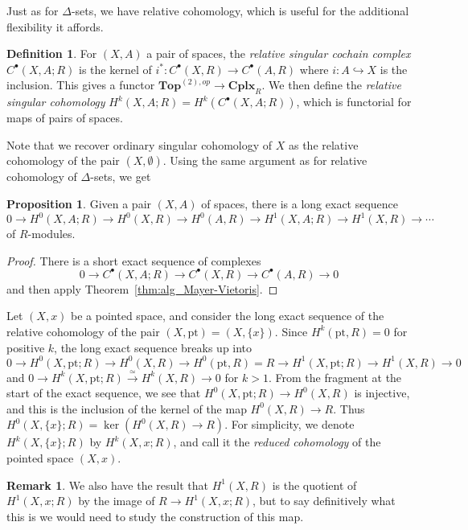 \documentclass{tufte-handout}
\def\into {\hookrightarrow}
\def\pt {\mathrm{pt}}
\def\Top {\mathbf{Top}}
\def\Cplx{\mathbf{Cplx}}
\theoremstyle{definition}
\newtheorem{prop}{Proposition}
\newtheorem{definition}{Definition}
\newtheorem*{rem}{Remark}
\begin{document}
Just as for $\Delta$-sets, we have relative cohomology, which is useful for the additional flexibility
it affords.

\begin{definition}
For $(X,A)$ a pair of spaces, the \emph{relative singular cochain complex} $C^\bullet(X,A;R)$ is the kernel of $i^*\colon C^\bullet(X,R) \to C^\bullet(A,R)$
where $i\colon A\into X$ is the inclusion. This gives a functor $\Top^{(2),op}\to \Cplx_R$. We then define the \emph{relative singular cohomology}
$H^k(X,A;R) = H^k(C^\bullet(X,A;R))$, which is functorial for maps of pairs of spaces.
\end{definition}

Note that we recover ordinary singular cohomology of $X$ as the relative cohomology of the pair 
$(X,\emptyset)$. Using the same argument as for relative cohomology of $\Delta$-sets, we get

\begin{prop}\label{prop:les_of_pair_of_spaces}
Given a pair $(X,A)$ of spaces, there is a long exact sequence
\[
0\to H^0(X,A;R) \to H^0(X,R) \to H^0(A,R) \to H^1(X,A;R) \to H^1(X,R) \to \cdots
\]
of $R$-modules.
\end{prop}

\begin{proof}
There is a short exact sequence of complexes
\[
	0\to C^\bullet(X,A;R) \to C^\bullet(X,R)\to C^\bullet(A,R) \to 0
\]
and then apply Theorem~\ref{thm:alg_Mayer-Vietoris}.
\end{proof}

Let $(X,x)$ be a pointed space, and consider the long exact sequence of the relative cohomology of
 the pair $(X,\pt) = (X,\{x\})$. Since $H^k(\pt,R) = 0$ for positive $k$, the long exact sequence breaks up into
\[
0\to H^0(X,\pt;R) \to H^0(X,R) \to H^0(\pt,R) = R \to H^1(X,\pt;R) \to H^1(X,R) \to 0
\]
and $0\to H^k(X,\pt;R) \xrightarrow{\simeq} H^k(X,R) \to 0$ for $k>1$. From the fragment at the 
start of the exact sequence, we see that $H^0(X,\pt;R) \to H^0(X,R)$ is injective, and this is the 
inclusion of the kernel of the map $H^0(X,R) \to R$. Thus $H^0(X,\{x\};R) = \ker(H^0(X,R) \to R)$.
For simplicity, we denote $H^k(X,\{x\};R)$ by $H^k(X,x;R)$, and call it the \emph{reduced cohomology}
of the pointed space $(X,x)$.


\begin{rem}
We also have the result that $H^1(X,R)$ is the quotient of $H^1(X,x;R)$ by the image of 
$R\to H^1(X,x;R)$, but to say definitively what this is we would need to study the construction
of this map. 
\end{rem}
\end{document}
